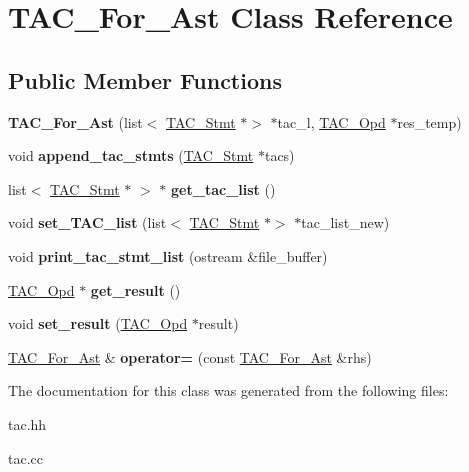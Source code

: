 \hypertarget{classTAC__For__Ast}{}\section{T\+A\+C\+\_\+\+For\+\_\+\+Ast Class Reference}
\label{classTAC__For__Ast}
\subsection*{Public Member Functions}
\begin{DoxyCompactItemize}
\item 
\mbox{\label{classTAC__For__Ast_ae8b990bd04dcd028935fccdb598091a8}} 
{\bfseries T\+A\+C\+\_\+\+For\+\_\+\+Ast} (list$<$ \hyperlink{classTAC__Stmt}{T\+A\+C\+\_\+\+Stmt} $\ast$$>$ $\ast$tac\+\_\+l, \hyperlink{classTAC__Opd}{T\+A\+C\+\_\+\+Opd} $\ast$res\+\_\+temp)
\item 
\mbox{\label{classTAC__For__Ast_ab202d09824991770a9b2b7a5faedfc57}} 
void {\bfseries append\+\_\+tac\+\_\+stmts} (\hyperlink{classTAC__Stmt}{T\+A\+C\+\_\+\+Stmt} $\ast$tacs)
\item 
\mbox{\label{classTAC__For__Ast_a174d0fb5f11f1805bc7d5fe500814773}} 
list$<$ \hyperlink{classTAC__Stmt}{T\+A\+C\+\_\+\+Stmt} $\ast$ $>$ $\ast$ {\bfseries get\+\_\+tac\+\_\+list} ()
\item 
\mbox{\label{classTAC__For__Ast_a8564bd1e2ddf5d62a11c5f52ffb1354c}} 
void {\bfseries set\+\_\+\+T\+A\+C\+\_\+list} (list$<$ \hyperlink{classTAC__Stmt}{T\+A\+C\+\_\+\+Stmt} $\ast$$>$ $\ast$tac\+\_\+list\+\_\+new)
\item 
\mbox{\label{classTAC__For__Ast_a234137da51bad0bd2ed69dd1bdce9755}} 
void {\bfseries print\+\_\+tac\+\_\+stmt\+\_\+list} (ostream \&file\+\_\+buffer)
\item 
\mbox{\label{classTAC__For__Ast_a2a8b2c42832a1eed55c9898ac20249a2}} 
\hyperlink{classTAC__Opd}{T\+A\+C\+\_\+\+Opd} $\ast$ {\bfseries get\+\_\+result} ()
\item 
\mbox{\label{classTAC__For__Ast_a2fdcb61079d71b033e23d5e1e1e84430}} 
void {\bfseries set\+\_\+result} (\hyperlink{classTAC__Opd}{T\+A\+C\+\_\+\+Opd} $\ast$result)
\item 
\mbox{\label{classTAC__For__Ast_acc3ffe623c0c83dde62353db9d9b64a2}} 
\hyperlink{classTAC__For__Ast}{T\+A\+C\+\_\+\+For\+\_\+\+Ast} \& {\bfseries operator=} (const \hyperlink{classTAC__For__Ast}{T\+A\+C\+\_\+\+For\+\_\+\+Ast} \&rhs)
\end{DoxyCompactItemize}


The documentation for this class was generated from the following files\+:\begin{DoxyCompactItemize}
\item 
tac.\+hh\item 
tac.\+cc\end{DoxyCompactItemize}
